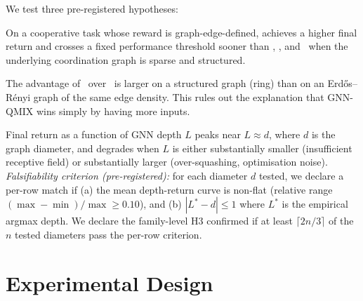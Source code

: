 We test three pre-registered hypotheses:

\begin{description}[leftmargin=4em,style=nextline]
  \item[\textbf{H1 (structure beats no-structure):}]
    On a cooperative task whose reward is graph-edge-defined, \gnnqmix
    achieves a higher final return and crosses a fixed performance
    threshold sooner than \iql, \vdn, and \qmix\ when the underlying
    coordination graph is sparse and structured.
  \item[\textbf{H2 (structure $>$ matched-density random):}]
    The advantage of \gnnqmix\ over \qmix\ is larger on a structured
    graph (ring) than on an Erd\H{o}s--R\'enyi graph of the same edge
    density. This rules out the explanation that GNN-QMIX wins simply by
    having more inputs.
  \item[\textbf{H3 (depth--diameter inverted-U):}]
    Final return as a function of GNN depth $L$ peaks near $L \approx d$,
    where $d$ is the graph diameter, and degrades when $L$ is either
    substantially smaller (insufficient receptive field) or substantially
    larger (over-squashing, optimisation noise). \emph{Falsifiability
    criterion (pre-registered):} for each diameter $d$ tested, we declare
    a per-row match if (a) the mean depth-return curve is non-flat
    (relative range $(\max - \min)/\max \ge 0.10$), and (b) $|L^* - d|
    \le 1$ where $L^*$ is the empirical argmax depth. We declare the
    family-level H3 confirmed if at least $\lceil 2n/3 \rceil$ of the $n$
    tested diameters pass the per-row criterion.
\end{description}

\section{Experimental Design}
\label{sec:design}

